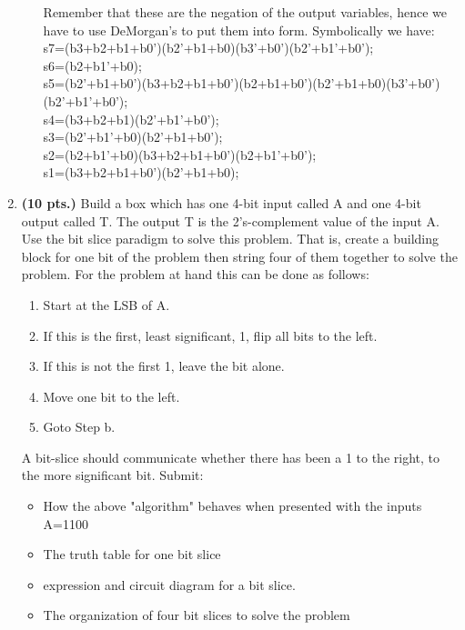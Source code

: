 \begin{enumerate}
\begin{enumerate}
\begin{onlysolution}
{%

Remember that these are the negation of the output variables, hence
we have to use DeMorgan's to put them into \POSmin form.  
Symbolically we have:
s7=(b3+b2+b1+b0')(b2'+b1+b0)(b3'+b0')(b2'+b1'+b0'); \\
s6=(b2+b1'+b0); \\
s5=(b2'+b1+b0')(b3+b2+b1+b0')(b2+b1+b0')(b2'+b1+b0)(b3'+b0')(b2'+b1'+b0'); \\
s4=(b3+b2+b1)(b2'+b1'+b0'); \\
s3=(b2'+b1'+b0)(b2'+b1+b0'); \\
s2=(b2+b1'+b0)(b3+b2+b1+b0')(b2+b1'+b0'); \\
s1=(b3+b2+b1+b0')(b2'+b1+b0); \\
}\end{onlysolution} 
\end{enumerate}

\item \textbf{ (10 pts.)} Build a box which has one 4-bit input called A and  
one 4-bit output called T. The output T is the 2's-complement value
of the input A.  Use the bit slice paradigm to solve this
problem.  That is, create a building block for one bit of the problem 
then string four of them together to solve the problem.
For the problem at hand this can be done as follows:
\begin{enumerate}
	\item Start at the LSB of A.
        \item If this is the first, least significant, 1, flip all bits 
		to the left.
        \item If this is not the first 1, leave the bit alone.
        \item Move one bit to the left.
        \item Goto Step b.
\end{enumerate}
A bit-slice should communicate whether there has been a 1 to the right,
to the more significant bit.  Submit:
\begin{itemize}
	\item How the above "algorithm" behaves when presented with
        the inputs A=1100
        \item The truth table for one bit slice
        \item \SOPmin expression and circuit diagram for a bit slice.
        \item The organization of four bit slices to solve the problem
\end{itemize}


\end{enumerate}
